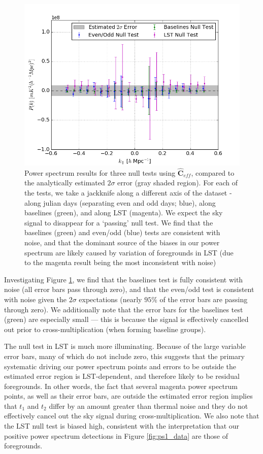 \documentclass[preprint2,numberedappendix,tighten]{aastex6}  %
\begin{document}
\begin{figure}
	\centering
	\includegraphics[width=1\textwidth]{plots/null_zoom.png}
	\caption{Power spectrum results for three null tests using $\widehat{\textbf{C}}_{eff}$, compared to the analytically estimated 
$2\sigma$ error (gray shaded region). For each of the tests, we take a jackknife along a different axis of the dataset - along julian days (separating 
even and odd days; blue), along baselines (green), and along LST (magenta). We expect the sky signal to disappear for a `passing' null test.
We find that the baselines (green) and even/odd (blue) tests are consistent with noise, and that the dominant source of the biases in our power spectrum are likely caused by variation of foregrounds in LST (due to the magenta result being the most inconsistent with noise)}
	\label{fig:null}
\end{figure}

Investigating Figure \ref{fig:null}, we find that the baselines test is fully consistent with noise (all error bars pass through zero), and that the even/odd test is consistent with noise given the $2\sigma$ expectations (nearly $95\%$ of the error bars are passing through zero). We additionally note that the error bars for the baselines test (green) are especially small --- this is because the signal is effectively cancelled out prior to cross-multiplication (when forming baseline groups). 

The null test in LST is much more illuminating. Because of the large variable error bars, many of which do not include zero, this suggests that the primary systematic driving our power spectrum points and errors to be outside the 
estimated error region is LST-dependent, and therefore likely to be residual foregrounds. In other words, the fact that several magenta power spectrum points, as well as their error bars, are outside the estimated error region implies that $t_{1}$ and 
$t_{2}$ differ by an amount greater than thermal noise and they do not effectively cancel out the sky signal during cross-multiplication. We also note that the LST null test is biased high, consistent with the interpretation that our positive power spectrum detections in Figure \ref{fig:ps1_data} are those of foregrounds.
\end{document}
